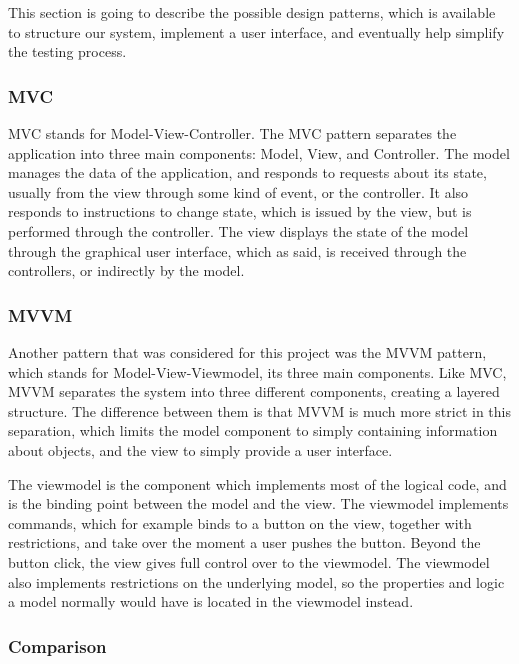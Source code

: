This section is going to describe the possible design patterns, which is available to structure our system, implement a user interface, and eventually help simplify the testing process.

\subsubsection{MVC}

MVC stands for Model-View-Controller. The MVC pattern separates the application into three main components: Model, View, and Controller. The model manages the data of the application, and responds to requests about its state, usually from the view through some kind of event, or the controller.  It also responds to instructions to change state, which is issued by the view, but is performed through the controller. The view displays the state of the model through the graphical user interface, which as said, is received through the controllers, or indirectly by the model. \cite{Pattern1}

\subsubsection{MVVM}

Another pattern that was considered for this project was the MVVM pattern, which stands for Model-View-Viewmodel, its three main components. Like MVC, MVVM separates the system into three different components, creating a layered structure. The difference between them is that MVVM is much more strict in this separation, which limits the model component to simply containing information about objects, and the view to simply provide a user interface. \cite{Pattern2}

The viewmodel is the component which implements most of the logical code, and is the binding point between the model and the view. The viewmodel implements commands, which for example binds to a button on the view, together with restrictions, and take over the moment a user pushes the button. Beyond the button click, the view gives full control over to the viewmodel. The viewmodel also implements restrictions on the underlying model, so the properties and logic a model normally would have is located in the viewmodel instead. \cite{Pattern2}

\subsubsection{Comparison}

